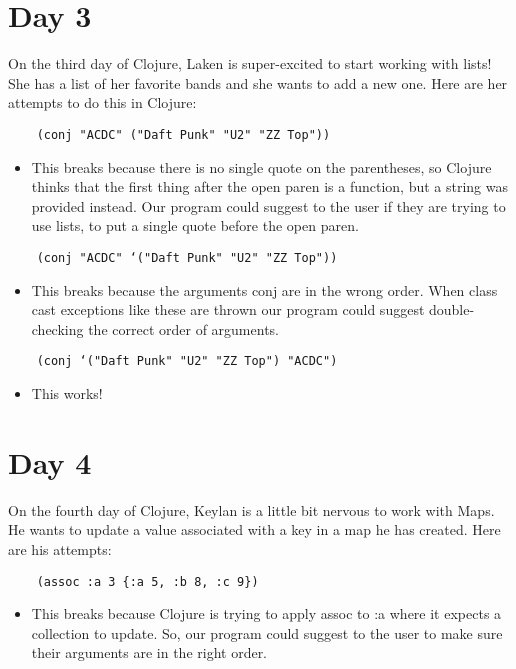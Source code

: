 \documentclass[12pt]{article}
\begin{document}
\section{Day 3}
On the third day of Clojure, Laken is super-excited to start working with lists! She has a list of her favorite bands and she wants to add a new one. Here are her attempts to do this in Clojure:
\begin{verbatim}
	(conj "ACDC" ("Daft Punk" "U2" "ZZ Top"))
\end{verbatim}
\begin{itemize}
	\item This breaks because there is no single quote on the parentheses, so Clojure thinks that the first thing after the open paren is a function, but a string was provided instead. Our program could suggest to the user if they are trying to use lists, to put a single quote before the open paren. 
\end{itemize}

\begin{verbatim}
	(conj "ACDC" ‘("Daft Punk" "U2" "ZZ Top"))
\end{verbatim}
\begin{itemize}
	\item This breaks because the arguments conj are in the wrong order. When class cast exceptions like these are thrown our program could suggest double-checking the correct order of arguments.
\end{itemize}

\begin{verbatim}
	(conj ‘("Daft Punk" "U2" "ZZ Top") "ACDC")
\end{verbatim}
\begin{itemize}
	\item This works!
\end{itemize}

\section{Day 4}
On the fourth day of Clojure, Keylan is a little bit nervous to work with Maps. He wants to update a value associated with a key in a map he has created. Here are his attempts:
\begin{verbatim}
	(assoc :a 3 {:a 5, :b 8, :c 9})
\end{verbatim}
\begin{itemize}
	\item This breaks because Clojure is trying to apply assoc to :a where it expects a collection to update. So, our program could suggest to the user to make sure their arguments are in the right order.
\end{itemize}
\end{document}
